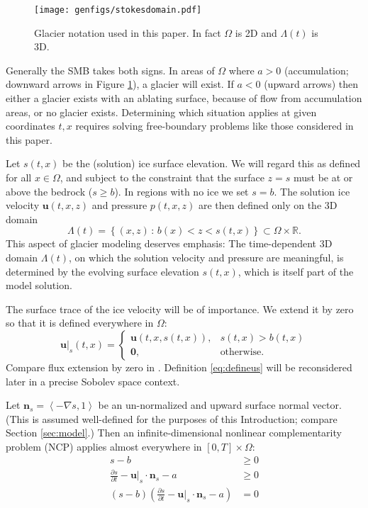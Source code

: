 \documentclass[hidelinks,onefignum,onetabnum,final]{siamart220329}  %
\newcommand{\RR}{\mathbb{R}}
\newcommand{\grad}{\nabla}
\newcommand{\bn}{\mathbf{n}}
\newcommand{\bu}{\mathbf{u}}
\newcommand{\bzero}{\bm{0}}
\begin{document}
\begin{figure}[ht]
\centering
\texttt{[image: genfigs/stokesdomain.pdf]}
\caption{Glacier notation used in this paper.  In fact $\Omega$ is 2D and $\Lambda(t)$ is 3D.}
\label{fig:stokesdomain}
\end{figure}

Generally the SMB takes both signs.  In areas of $\Omega$ where $a>0$ (accumulation; downward arrows in Figure \ref{fig:stokesdomain}), a glacier will exist.  If $a<0$ (upward arrows) then either a glacier exists with an ablating surface, because of flow from accumulation areas, or no glacier exists.  Determining which situation applies at given coordinates $t,x$ requires solving free-boundary problems like those considered in this paper.

Let $s(t,x)$ be the (solution) ice surface elevation.  We will regard this as defined for all $x\in\Omega$, and subject to the constraint that the surface $z=s$ must be at or above the bedrock ($s \ge b$).  In regions with no ice we set $s=b$.  The solution ice velocity $\bu(t,x,z)$ and pressure $p(t,x,z)$ are then defined only on the 3D domain
\begin{equation}
\Lambda(t) = \left\{(x,z)\,:\,b(x) < z < s(t,x)\right\} \subset \Omega \times \RR. \label{eq:icydomain}
\end{equation}
This aspect of glacier modeling deserves emphasis:  The time-dependent 3D domain $\Lambda(t)$, on which the solution velocity and pressure are meaningful, is determined by the evolving surface elevation $s(t,x)$, which is itself part of the model solution.

The surface trace of the ice velocity will be of importance.  We extend it by zero so that it is defined everywhere in $\Omega$:
\begin{equation}
\bu|_s(t,x) = \begin{cases} \bu(t,x,s(t,x)), & s(t,x)>b(t,x) \\
                            \bzero, & \text{otherwise} .\end{cases} \label{eq:defineus}
\end{equation}
Compare flux extension by zero in \cite{SchoofHewitt2013}.  Definition \eqref{eq:defineus} will be reconsidered later in a precise Sobolev space context.

Let $\bn_s = \left<-\grad s,1\right>$ be an un-normalized and upward surface normal vector.  (This is assumed well-defined for the purposes of this Introduction; compare Section \ref{sec:model}.)  Then an infinite-dimensional nonlinear complementarity problem (NCP) \cite{Bueler2021conservation,FacchineiPang2003,SchoofHewitt2013} applies almost everywhere in $[0,T]\times \Omega$:
\begin{subequations}
\label{eq:ncp}
\begin{align}
s - b &\ge 0 \\
\frac{\partial s}{\partial t} - \bu|_s \cdot \bn_s - a &\ge 0 \\
(s - b) \left(\frac{\partial s}{\partial t} - \bu|_s \cdot \bn_s - a\right) &= 0
\end{align}
\end{subequations}
\end{document}
